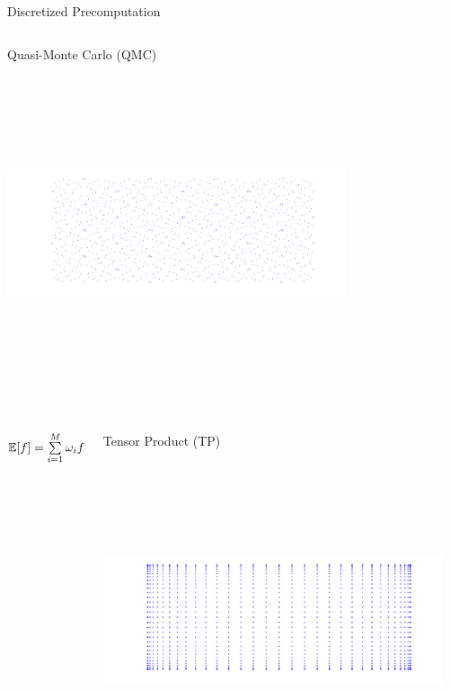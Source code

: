 \documentclass[final]{beamer}
\newcommand{\E}{\ensuremath{\mathbb{E}} } %
\newcommand {\bxi} {\mbox{\boldmath $\xi$}}%
\begin{document}
\begin{frame}{}
{\begin{columns}[t]
\begin{column}{.30\linewidth}
\begin{block}{\centering Discretized Precomputation}
\begin{columns}[T]
\begin{column}{12cm}{\centering \scriptsize{Quasi-Monte Carlo (QMC)}}
\centering\includegraphics[height=10cm, width = 10cm]{figures/Sobolpoints}
\end{column}
\end{columns}

\vspace{0.5em}

\begin{columns}[T]

\begin{column}{10cm}{}
\centering
\vspace{3em}
$\E[f] = \sum\limits_{i=1}^M \omega_i f(\bxi_i)$
\end{column}

\begin{column}{12cm}{\centering \scriptsize{Tensor Product (TP)}}
\centering\includegraphics[height=10cm, width = 10cm]{figures/tensorproductpoints}
\end{column}


\end{columns}
\end{block}
\end{column}
\end{columns}}
\end{frame}
\end{document}
